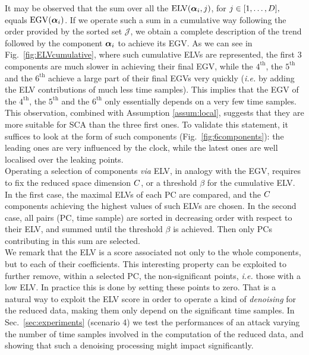 It may be observed that the sum over all the $\mathrm{ELV}(\boldsymbol\alpha_i,j)$, for $j\in[1,\dots,D],$   equals $\mathrm{EGV}(\boldsymbol\alpha_i)$. If we operate such a sum in a cumulative way following the order provided by the sorted set $\mathcal{J}$, we obtain a complete description of the trend followed by the component $\boldsymbol\alpha_i$ to achieve its EGV. As we can see in Fig.~\ref{fig:ELVcumulative}, where such cumulative ELVs are represented, the first 3 components are much slower in achieving their final EGV, while the $4^\text{th}$, the $5^\text{th}$ and the $6^\text{th}$ achieve a large part of their final EGVs very quickly ({\em i.e.} by adding the ELV contributions of much less time samples). This implies that the EGV of the $4^\text{th}$, the $5^\text{th}$ and the $6^\text{th}$ only essentially depends on a very few time samples. This observation, combined with Assumption \ref{assum:local}, suggests that they are more suitable for SCA than the three first ones. To validate this statement, it suffices to look at the form of such components (Fig.~\ref{fig:6components}): the leading ones are very influenced by the clock, while the latest ones are well localised over the leaking points.\\

Operating a selection of components {\em via} ELV, in analogy with the EGV, requires to fix the reduced space dimension $C$, or a threshold $\beta$ for the cumulative ELV. In the first case, the maximal ELVs of each PC are compared, and the $C$ components achieving the highest values of such ELVs are chosen. In the second case, all pairs (PC, time sample) are sorted in decreasing order with respect to their ELV, and summed until the threshold $\beta$ is achieved. Then only PCs contributing in this sum are selected. \\

We remark that the ELV is a score associated not only to the whole components, but to each of their coefficients. This interesting property can be exploited to further remove, within a selected PC, the non-significant points, {\em i.e.} those with a low ELV. In practice this is done by setting these points to zero. That is a natural way to exploit the ELV score in order to operate a kind of {\em denoising} for the reduced data, making them only depend  on the significant time samples. In Sec.~\ref{sec:experiments} (scenario 4) we test the performances of an attack varying the number of time samples involved in the computation of the reduced data, and showing that such a denoising processing might impact significantly. 
 



